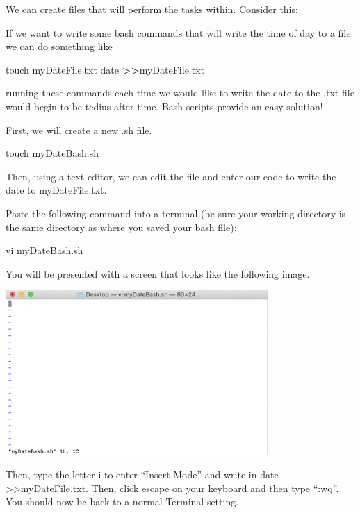 \documentclass[]{book}
\newenvironment{Shaded}{\begin{snugshade}}{\end{snugshade}}
\newcommand{\FunctionTok}[1]{\textcolor[rgb]{0.00,0.00,0.00}{#1}}
\newcommand{\OperatorTok}[1]{\textcolor[rgb]{0.81,0.36,0.00}{\textbf{#1}}}
\newcommand{\NormalTok}[1]{#1}
\begin{document}
We can create files that will perform the tasks within. Consider this:

If we want to write some bash commands that will write the time of day
to a file we can do something like

\begin{Shaded}
\begin{Highlighting}[]
\FunctionTok{touch}\NormalTok{ myDateFile.txt}
\FunctionTok{date} \OperatorTok{>>}\NormalTok{myDateFile.txt}
\end{Highlighting}
\end{Shaded}

running these commands each time we would like to write the date to the
.txt file would begin to be tedius after time. Bash scripts provide an
easy solution!

First, we will create a new .sh file.

\begin{Shaded}
\begin{Highlighting}[]
\FunctionTok{touch}\NormalTok{ myDateBash.sh}
\end{Highlighting}
\end{Shaded}

Then, using a text editor, we can edit the file and enter our code to
write the date to myDateFile.txt.

Paste the following command into a terminal (be sure your working
directory is the same directory as where you saved your bash file):

vi myDateBash.sh

You will be presented with a screen that looks like the following image.

\includegraphics[width=0.75000\textwidth]{images/vim.png}

Then, type the letter i to enter ``Insert Mode'' and write in date
\textgreater{}\textgreater{}myDateFile.txt. Then, click escape on your
keyboard and then type ``:wq''. You should now be back to a normal
Terminal setting.
\end{document}
